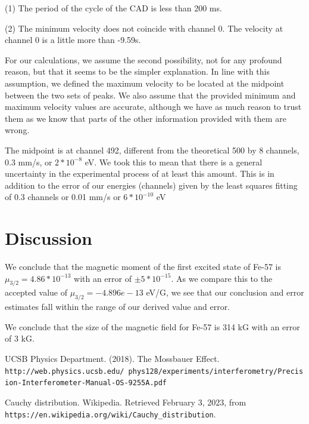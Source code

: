 \documentclass[letterpaper,12pt]{article}
\begin{document}
    (1) The period of the cycle of the CAD is less than 200 ms.
    
    (2) The minimum velocity does not coincide with channel 0. The velocity at channel 0 is a little more than -9.59s.
    
    For our calculations, we assume the second possibility, not for any profound reason, but that it seems to be the simpler explanation. In line with this assumption, we defined the maximum velocity to be located at the midpoint between the two sets of peaks. We also assume that the provided minimum and maximum velocity values are accurate, although we have as much reason to trust them as we know that parts of the other information provided with them are wrong.

    The midpoint is at channel 492, different from the theoretical 500 by 8 channels, 0.3 mm/s, or $2*10^{-8}$ eV. We took this to mean that there is a general uncertainty in the experimental process of at least this amount. This is in addition to the error of our energies (channels) given by the least squares fitting of 0.3 channels or 0.01 mm/s or $6*10^{-10}$ eV




\section{Discussion}

We conclude that the magnetic moment of the first excited state of Fe-57 is $\mu_{3/2}=4.86*10^{-13}$ with an error of $\pm5*10^{-15}$. As we compare this to the accepted value of $\mu_{3/2}=-4.896e-13$ eV/G, we see that our conclusion and error estimates fall within the range of our derived value and error.


We conclude that the size of the magnetic field for Fe-57 is 314 kG with an error of 3 kG.





\begin{thebibliography}{99}

UCSB Physics Department. (2018). The Mossbauer Effect. \texttt{http://web.physics.ucsb.edu/~phys128/experiments/interferometry/Precision-Interferometer-Manual-OS-9255A.pdf}

Cauchy distribution. Wikipedia. Retrieved February 3, 2023, from 
\texttt{https://en.wikipedia.org/wiki/Cauchy_distribution}.

\end{thebibliography}
\end{document}
